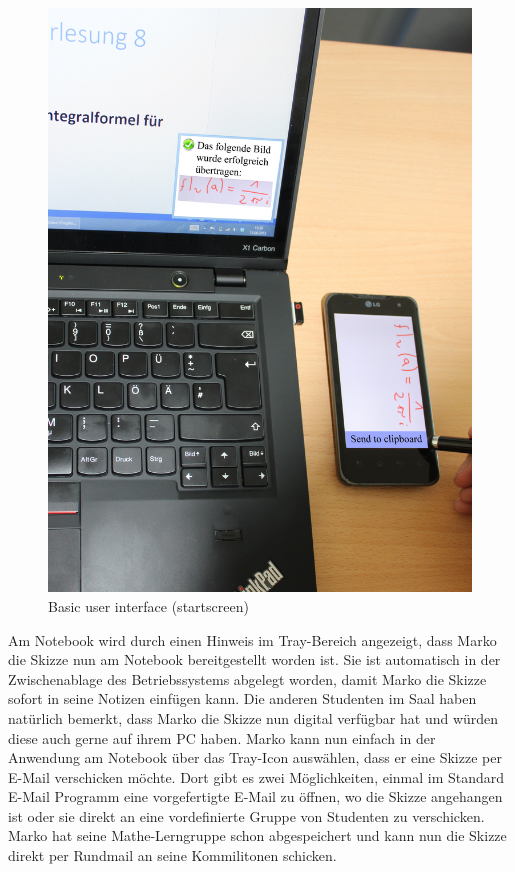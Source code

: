 \documentclass{chi-ext}
\begin{document}
\begin{figure}
  \centering
  \includegraphics[width=\linewidth]{img/szenario/szenario_3.jpg}
  \caption{Basic user interface (startscreen)}
  \label{fig:mockup_startscreen}
\end{figure}

Am Notebook wird durch einen Hinweis im Tray-Bereich angezeigt, dass Marko die Skizze nun am Notebook bereitgestellt worden ist. Sie ist automatisch in der Zwischenablage des Betriebssystems abgelegt worden, damit Marko die Skizze sofort in seine Notizen einfügen kann. 
Die anderen Studenten im Saal haben natürlich bemerkt, dass Marko die Skizze nun digital verfügbar hat und würden diese auch gerne auf ihrem PC haben. Marko kann nun einfach in der Anwendung am Notebook über das Tray-Icon auswählen, dass er eine Skizze per E-Mail verschicken möchte. Dort gibt es zwei Möglichkeiten, einmal im Standard E-Mail Programm eine vorgefertigte E-Mail zu öffnen, wo die Skizze angehangen ist oder sie direkt an eine vordefinierte Gruppe von Studenten zu verschicken. Marko hat seine Mathe-Lerngruppe schon abgespeichert und kann nun die Skizze direkt per Rundmail an seine Kommilitonen schicken.
\end{document}
